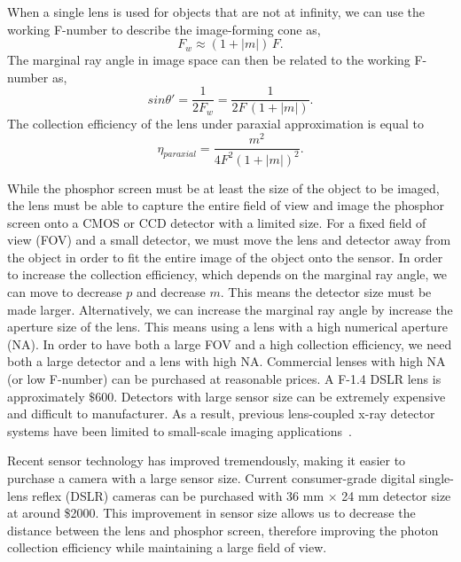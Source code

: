 When a single lens is used for objects that are not at infinity, we can use the working F-number to describe the image-forming cone as,
%
\begin{equation}
F_{w} \approx (1 + \lvert m \rvert) \, F.
\end{equation}
%
The marginal ray angle in image space can then be related to the working F-number as,
%
\begin{equation}
sin \theta' = \frac{1}{2 F_{w}} = \frac{1}{2 F \, (1+ \lvert m \rvert)}.
\end{equation}
%
%
The collection efficiency of the lens under paraxial approximation is equal to
%
\begin{equation}
\eta_{paraxial} = \frac{m^2}{4 F^2(1 + |m|)^2}.
\end{equation}
%

While the phosphor screen must be at least the size of the object to be imaged, the lens must be able to capture the entire field of view and image the phosphor screen onto a CMOS or CCD detector with a limited size.  For a fixed field of view (FOV) and a small detector, we must move the lens and detector away from the object in order to fit the entire image of the object onto the sensor.  In order to increase the collection efficiency, which depends on the marginal ray angle, we can move to decrease $p$ and decrease $m$.  This means the detector size must be made larger.  Alternatively, we can increase the marginal ray angle by increase the aperture size of the lens.  This means using a lens with a high numerical aperture (NA).  In order to have both a large FOV and a high collection efficiency, we need both a large detector and a lens with high NA.  Commercial lenses with high NA (or low F-number) can be purchased at reasonable prices.  A F-1.4 DSLR lens is approximately $\$600$.  Detectors with large sensor size can be extremely expensive and difficult to manufacturer.  As a result, previous lens-coupled x-ray detector systems have been limited to small-scale imaging applications~\citep{lee2001, kim2005, tate2005, madden2006}.  

Recent sensor technology has improved tremendously, making it easier to purchase a camera with a large sensor size.  Current consumer-grade digital single-lens reflex (DSLR) cameras can be purchased with 36 mm $\times$ 24 mm detector size at around \$2000.  This improvement in sensor size allows us to decrease the distance between the lens and phosphor screen, therefore improving the photon collection efficiency while maintaining a large field of view.

